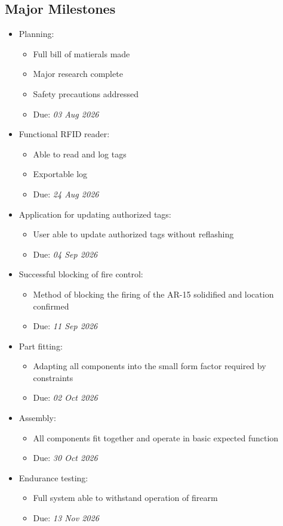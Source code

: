 \subsection{Major Milestones}

\begin{itemize}
\item Planning:
    \begin{itemize}
    \item Full bill of matierals made
    \item Major research complete
    \item Safety pre\-cautions addressed
    \item Due: \textit{03 Aug 2026}
    \end{itemize}
\item Functional RFID reader:
    \begin{itemize}
    \item Able to read and log tags
    \item Exportable log
    \item Due: \textit{24 Aug 2026}
    \end{itemize}
\item Application for updating authorized tags:
    \begin{itemize}
    \item User able to update authorized tags without reflashing
    \item Due: \textit{04 Sep 2026}
    \end{itemize}
\item Successful blocking of fire control:
    \begin{itemize}
    \item Method of blocking the firing of the AR-15 solidified and location confirmed
    \item Due: \textit{11 Sep 2026}
    \end{itemize}
\item Part fitting:
    \begin{itemize}
    \item Adapting all components into the small form factor required by constraints
    \item Due: \textit{02 Oct 2026}
    \end{itemize}
\item Assembly:
    \begin{itemize}
    \item All components fit together and operate in basic expected function
    \item Due: \textit{30 Oct 2026}
    \end{itemize}
\item Endurance testing:
    \begin{itemize}
    \item Full system able to withstand operation of firearm
    \item Due: \textit{13 Nov 2026}
    \end{itemize}
\end{itemize}


